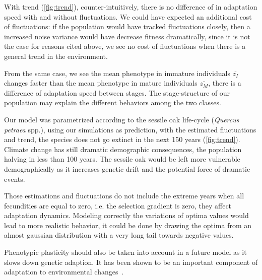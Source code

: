 With trend (\autoref{fig:trend}), counter-intuitively, there is no difference of in adaptation speed with and without fluctuations. We could have expected an additional cost of fluctuations: if the population would have tracked fluctuations closely, then a increased noise variance would have decrease fitness dramatically, since it is not the case for reasons cited above, we see no cost of fluctuations when there is a general trend in the environment.

From the same case, we see the mean phenotype in immature individuals $\overline{z_I}$ changes faster than the mean phenotype in mature individuals $\overline{z_M}$, there is a difference of adaptation speed between stages. The stage-structure of our population may explain the different behaviors among the two classes. 

Our model was parametrized according to the sessile oak life-cycle (\textit{Quercus petraea} spp.), using our simulations as prediction, with the estimated fluctuations and trend, the species does not go extinct in the next 150 years (\autoref{fig:trend}). Climate change has still dramatic demographic consequences, the population halving in less than 100 years. The sessile oak would be left more vulnerable demographically as it increases genetic drift and the potential force of dramatic events.

Those estimations and fluctuations do not include the extreme years when all fecundities are equal to zero, i.e. the selection gradient is zero, they affect adaptation dynamics. Modeling correctly the variations of optima values would lead to more realistic behavior, it could be done by drawing the optima from an almost gaussian distribution with a very long tail towards negative values.

Phenotypic plasticity should also be taken into account in a future model as it slows down genetic adaption. It has been shown to be an important component of adaptation to environmental changes~\citep{aitken_adaptation_2008}.